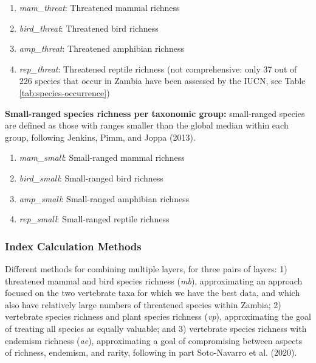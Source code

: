 \documentclass[
]{article}
\providecommand{\tightlist}{%
  \setlength{\itemsep}{0pt}\setlength{\parskip}{0pt}}
\begin{document}
\begin{enumerate}
\def\labelenumi{(\arabic{enumi})}
\setcounter{enumi}{16}
\tightlist
\item
  \emph{mam\_threat}: Threatened mammal richness
\item
  \emph{bird\_threat}: Threatened bird richness
\item
  \emph{amp\_threat}: Threatened amphibian richness
\item
  \emph{rep\_threat}: Threatened reptile richness (not comprehensive: only 37 out of 226 species that occur in Zambia have been assessed by the IUCN, see Table \ref{tab:species-occurrence})
\end{enumerate}

\textbf{Small-ranged species richness per taxonomic group:} small-ranged species are defined as those with ranges smaller than the global median within each group, following Jenkins, Pimm, and Joppa (2013).

\begin{enumerate}
\def\labelenumi{(\arabic{enumi})}
\setcounter{enumi}{20}
\tightlist
\item
  \emph{mam\_small}: Small-ranged mammal richness
\item
  \emph{bird\_small}: Small-ranged bird richness
\item
  \emph{amp\_small}: Small-ranged amphibian richness
\item
  \emph{rep\_small}: Small-ranged reptile richness
\end{enumerate}

\hypertarget{index-calculation-methods}{%
\subsubsection{Index Calculation Methods}\label{index-calculation-methods}}

Different methods for combining multiple layers, for three pairs of layers: 1) threatened mammal and bird species richness (\emph{mb}), approximating an approach focused on the two vertebrate taxa for which we have the best data, and which also have relatively large numbers of threatened species within Zambia; 2) vertebrate species richness and plant species richness (\emph{vp}), approximating the goal of treating all species as equally valuable; and 3) vertebrate species richness with endemism richness (\emph{ae}), approximating a goal of compromising between aspects of richness, endemism, and rarity, following in part Soto-Navarro et al. (2020).
\end{document}
